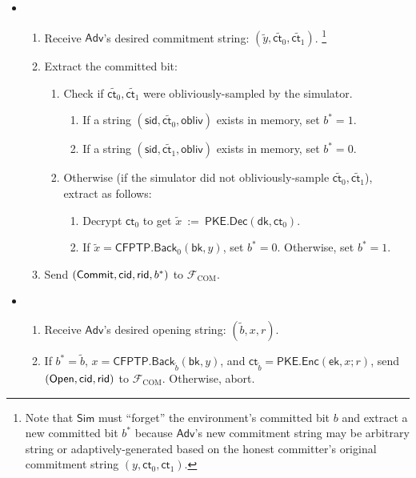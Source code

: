 \documentclass[11pt,letterpaper]{article}
\theoremstyle{plain} %
\theoremstyle{definition} %
\theoremstyle{remark} %
\newcommand{\eqdef}{\ {:=} \ }
\newcommand{\OpenMsg}{\mathsf{Open}}
\newcommand{\CommitMsg}{\mathsf{Commit}}
\newcommand{\obliv}{\mathsf{obliv}}
\newcommand{\Input}{x}
\newcommand{\PKE}{\mathsf{PKE}}
\newcommand{\Enc}{\mathsf{Enc}}
\newcommand{\Dec}{\mathsf{Dec}}
\newcommand{\EncKey}{\mathsf{ek}}
\newcommand{\DecKey}{\mathsf{dk}}
\newcommand{\ExtBit}{b^*}
\newcommand{\AdvBit}{\Adv{b}}
\newcommand{\Ct}{\mathsf{ct}}
\newcommand{\Rand}{r}
\newcommand{\CFPTP}{\mathsf{CFPTP}}
\newcommand{\Back}{\mathsf{Back}}
\newcommand{\BackKey}{\mathsf{bk}}
\newcommand{\Output}{y}
\newcommand{\Simulator}{{\mathsf{Sim}}} %
\newcommand{\Adversary}{{\mathsf{Adv}}} %
\newcommand{\Adv}[1]{\tilde{#1}} %
\newcommand{\IF}{\mathcal{F}} %
\newcommand{\sid}{\mathsf{sid}}
\newcommand{\IFCom}{\IF_{\mathrm{COM}}}
\newcommand{\CommBit}{b}
\begin{document}
\begin{itemize}
\item {}
\begin{enumerate}[nolistsep]
    \item Receive $\Adversary$'s desired commitment string: $(\Adv{\Output}, \Adv{\Ct_0}, \Adv{\Ct_1})$. \footnote{Note that $\Simulator$ must ``forget'' the environment's committed bit $\CommBit$ and extract a new committed bit $\ExtBit$ because $\Adversary$'s new commitment string may be arbitrary string or adaptively-generated based on the honest committer's original commitment string $(\Output, \Ct_0, \Ct_1)$.}
    \item Extract the committed bit:
    \begin{enumerate}[nolistsep]
        \item Check if $\Adv{\Ct_{0}}, \Adv{\Ct_{1}}$ were obliviously-sampled by the simulator.
        \begin{enumerate}[nolistsep]
            \item If a string $(\sid, \Adv{\Ct_{0}} ,\obliv)$ exists in memory, set $\ExtBit = 1$.
            \item If a string $(\sid, \Adv{\Ct_{1}} ,\obliv)$ exists in memory, set $\ExtBit = 0$.
        \end{enumerate}
        \item Otherwise (if the simulator did not obliviously-sample $\Adv{\Ct_{0}}, \Adv{\Ct_{1}}$), extract as follows:
        \begin{enumerate}[nolistsep]
            \item Decrypt $\Ct_0$ to get $\tilde{\Input} \eqdef \PKE.\Dec(\DecKey, \Ct_0)$.
            \item If $\tilde{\Input} = \CFPTP.\Back_0(\BackKey, \Output)$, set $\ExtBit = 0$. Otherwise, set $\ExtBit = 1$.
        \end{enumerate}
    \end{enumerate}
    \item Send $(\CommitMsg, \CommitterId, \ReceiverId, \ExtBit)$ to $\IFCom$.
\end{enumerate}

\item {}
\begin{enumerate}[nolistsep]
    \item Receive $\Adversary$'s desired opening string: $(\AdvBit, \Input, \Rand)$.
	\item If $\ExtBit = \AdvBit$, $\Input = \CFPTP.\Back_{\AdvBit}(\BackKey, \Output)$, and $\Ct_{\AdvBit} = \PKE.\Enc(\EncKey, \Input; \Rand)$, send $(\OpenMsg, \CommitterId, \ReceiverId)$ to $\IFCom$. Otherwise, abort.
\end{enumerate}

\end{itemize}
\end{document}
